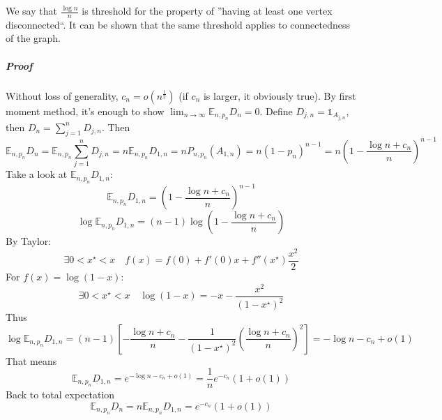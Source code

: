 We say that $\frac{\log n}{n}$ is threshold for the property of ''having at least one vertex disconnected``. It can be shown that the same threshold applies to connectedness of the graph.
\subparagraph{Proof}
Without loss of generality, $c_n = o\left(n^{\frac{1}{2}}\right)$ (if $c_n$ is larger, it obviously true). By first moment method, it's enough to show $\lim_{n \to \infty} \mathbb{E}_{n,p_n} D_n = 0$. Define $D_{j,n} = \mathds{1}_{A_{j,n}}$, then $D_n = \sum_{j=1}^n D_{j,n}$. Then
$$\mathbb{E}_{n,p_n} D_n = \mathbb{E}_{n,p_n}  \sum_{j=1}^n D_{j,n} = n \mathbb{E}_{n,p_n} D_{1,n} = nP_{n,p_n} (A_{1,n}) = n(1-p_n)^{n-1} = n \left( 1 - \frac{\log n + c_n}{n} \right)^{n-1} $$
Take a look at $\mathbb{E}_{n,p_n} D_{1,n} $:
$$\mathbb{E}_{n,p_n} D_{1,n} = \left( 1 - \frac{\log n + c_n}{n} \right)^{n-1}$$
$$\log \mathbb{E}_{n,p_n} D_{1,n} = (n-1)\log \left( 1 - \frac{\log n + c_n}{n} \right)$$
By Taylor:
$$\exists 0<x^{\star}<x \quad f(x) = f(0) + f'(0)x + f''(x^\star)\frac{x^2}{2} $$
For $f(x) = \log(1-x)$:
$$\exists 0<x^{\star}<x \quad  \log (1-x) = -x-\frac{x^2}{(1-x^\star)^2}$$
Thus
$$\log \mathbb{E}_{n,p_n} D_{1,n} = (n-1) \left[ -\frac{\log n + c_n}{n} - \frac{1}{(1-x^\star)^2} \left(\frac{\log n + c_n}{n}\right)^2 \right] = -\log n -c_n +o(1)$$
That means
$$\mathbb{E}_{n,p_n} D_{1,n} = e^{- \log n -c_n +o(1)} = \frac{1}{n}e^{-c_n} \left(1+o(1)\right)$$
Back to total expectation
$$\mathbb{E}_{n,p_n} D_n  = n \mathbb{E}_{n,p_n} D_{1,n} = e^{-c_n} \left(1+o(1)\right) $$

